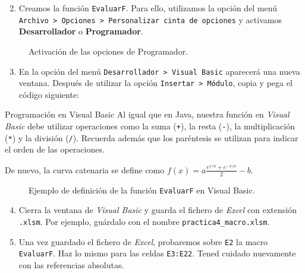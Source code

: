 \documentclass[
  spanish,
  11pt,
  a4paper,
  DIV=11,
  numbers=noendperiod]{scrartcl}
\begin{document}
\begin{enumerate}
\setcounter{enumi}{1}
\item Creamos la función \texttt{EvaluarF}. Para ello, utilizamos la opción del menú \texttt{Archivo > Opciones > Personalizar cinta de opciones} y activamos \textbf{Desarrollador} o \textbf{Programador}.
\end{enumerate}

\begin{figure}[H]
\caption{Activación de las opciones de Programador.}\label{fig-programador}
\end{figure}

\begin{enumerate}
\setcounter{enumi}{2}
\item En la opción del menú \texttt{Desarrollador > Visual Basic} aparecerá una nueva ventana. Después de utilizar la opción \texttt{Insertar > Módulo}, copia y pega el código siguiente:
\end{enumerate}


\begin{PracticeNoteBox}{Programación en Visual Basic}
Al igual que en Java, nuestra función en \emph{Visual Basic} debe utilizar operaciones como la suma (\texttt{+}), la resta (\texttt{-}), la multiplicación (\texttt{*}) y la división (\texttt{/}). Recuerda además que los paréntesis se utilizan para indicar el orden de las operaciones.

De nuevo, la curva catenaria se define como \(f(x) = a \frac{e^{x/a} + e^{-x/a}}{2} - b\).
\end{PracticeNoteBox}

\begin{figure}[H]
\caption{Ejemplo de definición de la función \texttt{EvaluarF} en Visual Basic.}\label{fig-evaluarf-macro}
\end{figure}

\begin{enumerate}
\setcounter{enumi}{3}
\item Cierra la ventana de \emph{Visual Basic} y guarda el fichero de \emph{Excel} con extensión \texttt{.xlsm}. Por ejemplo, guárdalo con el nombre \texttt{practica4\_macro.xlsm}.
\item Una vez guardado el fichero de \emph{Excel}, probaremos sobre \texttt{E2} la macro \texttt{EvaluarF}. Haz lo mismo para las celdas \texttt{E3:E22}. Tened cuidado nuevamente con las referencias absolutas.
\end{enumerate}
\end{document}
